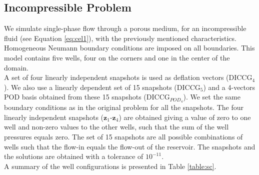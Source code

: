 \documentclass[review]{elsarticle}
\begin{document}
\subsection{Incompressible Problem}

We simulate single-phase flow through a porous medium, for an incompressible fluid (see Equation \eqref{eq:cel1}), with the previously mentioned characteristics. Homogeneous Neumann boundary conditions are imposed on all boundaries. This model contains five wells, four on the corners and one in the center of the domain. \\
A set of four linearly independent snapshots is used as deflation vectors (DICCG$_4$). We also use a linearly dependent set of 15 snapshots (DICCG$_5$) and a 4-vectors POD basis obtained from these 15 snapshots (DICCG$_{POD_4}$). We set the same boundary conditions as in the original problem for all the snapshots.
The four linearly independent snapshots ($\mathbf{z}_1$-$\mathbf{z}_4$) are obtained giving a value of zero to one well and non-zero values to the other wells, such that the sum of the well pressures equals zero. The set of 15 snapshots are all possible combinations of wells such that the flow-in equals the flow-out of the reservoir. The snapshots and the solutions are obtained with a tolerance of $10^{-11}$. \\
A summary of the well configurations is presented in Table \ref{table:sc}.
\renewcommand{\arraystretch}{1}
\end{document}

